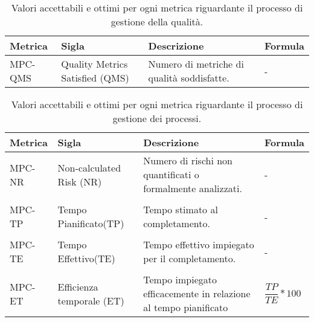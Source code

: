 \clearpage
{}
\begin{table}[H]	
	\centering
	\begin{tabular}{p{2cm} p{3cm} p{6cm} p{4cm}}
		\toprule
		\textbf{Metrica}& \textbf{Sigla} & \textbf{Descrizione} & \textbf{Formula} \\
		\midrule
		MPC-QMS & Quality Metrics Satisfied (QMS) & Numero di metriche di qualità soddisfatte. & - \\
		\bottomrule
	\end{tabular}
	\caption{Valori accettabili e ottimi per ogni metrica riguardante il processo di gestione della qualità.}
	\label{table:Valori accettabili e ottimi per ogni metrica riguardante il processo di gestione della qualità.}
\end{table}

\begin{table}[H]	
	\centering
	\begin{tabular}{p{2cm} p{3cm} p{6cm} p{4cm}}
		\toprule
		\textbf{Metrica}& \textbf{Sigla} & \textbf{Descrizione} & \textbf{Formula} \\
		\midrule
		MPC-NR & Non-calculated Risk (NR) & Numero di rischi non quantificati o formalmente analizzati. & - \\\\
		MPC-TP & Tempo Pianificato(TP) & Tempo stimato al completamento. & - \\\\
		MPC-TE & Tempo Effettivo(TE) & Tempo effettivo impiegato per il completamento. & - \\\\
		MPC-ET & Efficienza temporale (ET) & Tempo impiegato efficacemente in relazione al tempo pianificato & $ \dfrac{TP}{TE} * 100 $ \\
		\bottomrule
	\end{tabular}
	\caption{Valori accettabili e ottimi per ogni metrica riguardante il processo di gestione dei processi.}
	\label{table:Valori accettabili e ottimi per ogni metrica riguardante il processo di gestione dei processi.}
\end{table}

